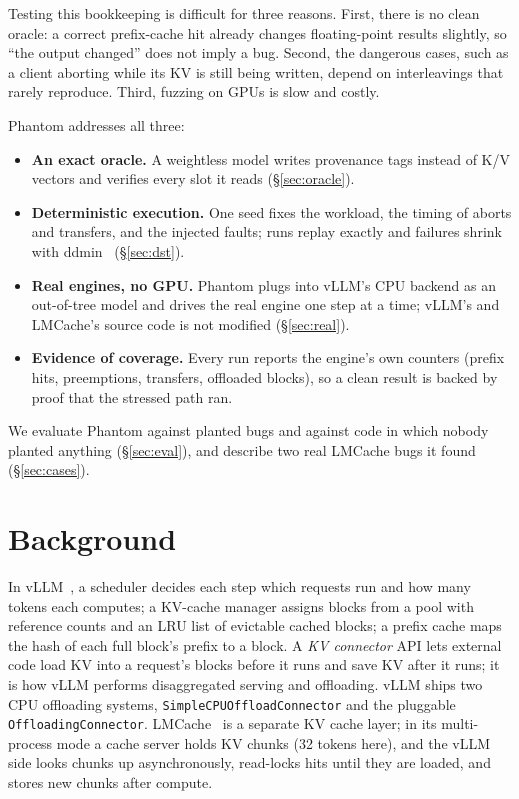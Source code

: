 \documentclass[10pt]{article}
\newcommand{\code}[1]{\texttt{\small #1}}
\begin{document}
Testing this bookkeeping is difficult for three reasons. First, there is no
clean oracle: a correct prefix-cache hit already changes floating-point
results slightly, so ``the output changed'' does not imply a bug. Second, the
dangerous cases, such as a client aborting while its KV is still being
written, depend on interleavings that rarely reproduce. Third, fuzzing on
GPUs is slow and costly.

Phantom addresses all three:
\begin{itemize}
\item \textbf{An exact oracle.} A weightless model writes provenance tags
instead of K/V vectors and verifies every slot it reads (\S\ref{sec:oracle}).
\item \textbf{Deterministic execution.} One seed fixes the workload, the
timing of aborts and transfers, and the injected faults; runs replay
exactly and failures shrink with ddmin~\cite{zeller2002ddmin}
(\S\ref{sec:dst}).
\item \textbf{Real engines, no GPU.} Phantom plugs into vLLM's CPU backend
as an out-of-tree model and drives the real engine one step at a time;
vLLM's and LMCache's source code is not modified (\S\ref{sec:real}).
\item \textbf{Evidence of coverage.} Every run reports the engine's own
counters (prefix hits, preemptions, transfers, offloaded blocks), so a clean
result is backed by proof that the stressed path ran.
\end{itemize}
We evaluate Phantom against planted bugs and against code in which nobody
planted anything (\S\ref{sec:eval}), and describe two real LMCache bugs it
found (\S\ref{sec:cases}).

\section{Background}
In vLLM~\cite{kwon2023vllm}, a scheduler decides each step which requests run
and how many tokens each computes; a KV-cache manager assigns blocks from a
pool with reference counts and an LRU list of evictable cached blocks; a
prefix cache maps the hash of each full block's prefix to a block. A
\emph{KV connector} API lets external code load KV into a request's blocks
before it runs and save KV after it runs; it is how vLLM performs
disaggregated serving and offloading. vLLM ships two CPU offloading systems,
\code{SimpleCPUOffloadConnector} and the pluggable \code{OffloadingConnector}.
LMCache~\cite{liu2025lmcache} is a separate KV cache layer; in its
multi-process mode a cache server holds KV chunks (32 tokens here), and the
vLLM side looks chunks up asynchronously, read-locks hits until they are
loaded, and stores new chunks after compute.
\end{document}
